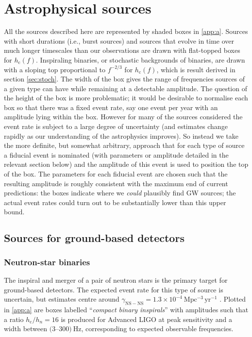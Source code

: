 \section{Astrophysical sources}\label{sec:sources}

All the sources described here are represented by shaded boxes in \ref{app:a}. Sources with short durations (i.e., burst sources) and sources that evolve in time over much longer timescales than our observations are drawn with flat-topped boxes for $h_\mathrm{c}(f)$. Inspiraling binaries, or stochastic backgrounds of binaries, are drawn with a sloping top proportional to $f^{-2/3}$ for $h_\mathrm{c}(f)$, which is result derived in section \ref{sec:stoch}. The width of the box gives the range of frequencies sources of a given type can have while remaining at a detectable amplitude. The question of the height of the box is more problematic; it would be desirable to normalise each box so that there was a fixed event rate, say one event per year with an amplitude lying within the box. However for many of the sources considered the event rate is subject to a large degree of uncertainty (and estimates change rapidly as our understanding of the astrophysics improves). So instead we take the more definite, but somewhat arbitrary, approach that for each type of source a fiducial event is nominated (with parameters or amplitude detailed in the relevant section below) and the amplitude of this event is used to position the top of the box. The parameters for each fiducial event are chosen such that the resulting amplitude is roughly consistent with the maximum end of current predictions: the boxes indicate where we \emph{could} plausibly find GW sources; the actual event rates could turn out to be substantially lower than this upper bound. 

\subsection{Sources for ground-based detectors}

\subsubsection{Neutron-star binaries}

The inspiral and merger of a pair of neutron stars is the primary target for ground-based detectors. The expected event rate for this type of source is uncertain, but estimates centre around $\gamma_{\mathrm{NS-NS}}=1.3\times 10^{-4}~\mathrm{Mpc^{-3}\,yr^{-1}}$ \citep{CBC}. Plotted in \ref{app:a} are boxes labelled ``\emph{compact binary inspirals}'' with amplitudes such that a ratio $h_\mathrm{c}/h_{n}=16$ is produced for Advanced LIGO at peak sensitivity and a width between $(3$--$300)~\mathrm{Hz}$, corresponding to expected observable frequencies.

